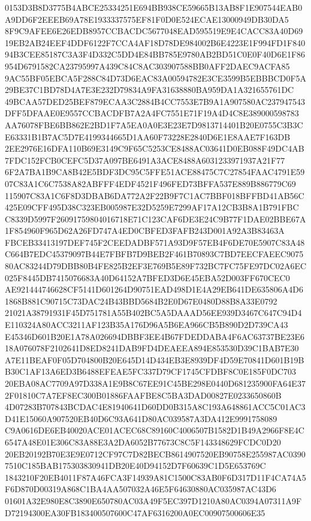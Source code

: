 \documentclass[UTF8,fontset=fandol,zihao=-4,a4paper]{ctexart}
\begin{document}
{{0153D3B8D3775B4ABCE25334251E694BB938CE59665B13AB8F1E907544EAB0A9DD6F2EEEB69A78E1933337575EF81F0D0E524ECAE13000949DB30DA5
8F9C9AFEE6E26EDB8957CCBACDC5677048EAD595519E9E4CACC83A40D6919EB2AB24EEF4DDF6122F7CCA4AF18D78DE984002B6E4223E1F994FD1F840
94B3CEE85187C3A3F4D332C5DD4E84BB785E9780AB2BD51C0E0F40D6E1F86954D6791582CA23795997A439C84C8AC303907588BB0AFF2DAEC9ACFA85
9AC55BF05EBCA5F288C84D73D6EAC83A00594782E3CE3599B5EBBBCD0F5A29BE37C1BD78D4A7E3E232D79834A9FA31638880BA959DA1A321655761DC
49BCAA57DED25BEF879ECAA3C2884B4CC7553E7B9A1A907580AC237947543DFF5DFAAE0E9557CCBACDFB7A2A4FC7551E71F19A4D4C8E389000598783
AA76078FBE6BB862E2BD1F7A5EA0A0E3E23E7D9813714401B20E0755C3B3CE63331B1B7AC5D7E4199344665D1AA60F73228E2840D6E1E8AAE7F163DB
2EE2976E16DFA110B69E3149C9F65C5253CE8488AC03641D0EB088F49DC4AB7FDC152FCB0CEFC5D37A097BE6491A3ACE8488A6031233971937A21F77
6F2A7BA1B9CA8B42E5BDF3DC95C5FFE51ACE88475C7C27854FAAC4791E5907C83A1C6C7538A82ABFFF4EDF4521F496FED73BFFA537E889B886779C69
115907C83A1C6F8D3DBAB6DA772A2F22B9F7C1AC7BBF018BFFBD41AB56C425E09CFF495D38C323EB005987E32D5259E7299AF17A12CB3B8A1B791FBC
C8339D5997F26091759804016718E71C123CAF6DE3E24C9B77F1DAE02BBE67A1F854960F965D62A26FD747A4ED0CBFED3FAFB243D001A92A3B83463A
FBCEB33413197DEF745F2CEEDADBF571A93D9F57EB4F6DE70E5907C83A48C664B7EDC45379097B44E7FBFB7D9BEB2F461B70893C7BD7EECFAEEC9075
80AC83244D79DBB80B4FE825B2EF3E769B5E89F732BC7FC75FE97DC02A6EC025F8445DB7415076683A40D64152A7BFED3D6E45EBA52D003FF670CEC0
AE921444746628CF5141D601264D90751EAD498D1E4A29EB641DE635806A4D61868B881C90715C73DAC24B43BBD5684B2E0D67E0480D88B8A33E0792
21021A38791931F45D751781A55B402BC5A5DAAAD56EE939D3467C647C94D4E110324A80ACC3211AF123B35A176D96A5B6EA966CB5B890D2D739CA43
E45346D601B20E1A78A026694DBBF3EE4B67FDEDDABA4F6AC63737BE23E618A076078F2102641D8ED8241DAB9FD4DEAEEA894E853530D39C1BAB7E30
A7E11BEAF0F05D704800B20E645D14D434EB3E8939DF4D59E70841D601B19BB30C1AF13A6ED3B6488EFEAE5FC337D79CF1745CFDBF8C0E185F0DC703
20EBA08AC7709A97D338A1E9B8C67EE91C45BE298E0440D681235900FA64E372F01810C7A7EF8EC300B01886FAAFBE8C5BA3DAD00827E0233650860B
4D07283B707843BCDAC4E81940641D60DD0B315A8C193A648861ACC5C01AC3D41E15060A907520EB40D6C93A641D80AC039587A3DA412E9991758089
C9A0616DE6EB40020ACE01ACEC68C89160C4006507B1582D1B49A2966F8E4C6547A48E01E306C83A88E3A2DA6052B77673C8C5F143348629FCDC0D20
20EB20192B70E3E9E0712CF97C7D82BECB8614907520EB90758E255987AC03907510C185BAB175303830941DB20E40D94152D7F60639C1D5E653769C
1843210F20EB4011F87A46FCA3F14939A81C1500C83AB0F6D317D11F4CA74A5F6D870D00319A868C1BA4AA507032A46E5F64630880AC035987AC43D6
01601A32E980E8C3890E650780AC03A49F5EC397D1210A80AC0394A07311A9FD72194300EA30FB183400507600C47AF6316200A0EC00907500606E35
}}
\end{document}

